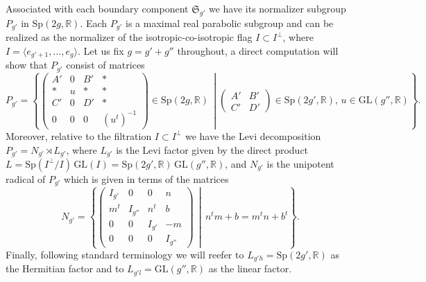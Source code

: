 \documentclass[11pt]{amsart}
\theoremstyle{plain}
\theoremstyle{definition}
\theoremstyle{remark}
\newcommand{\R}{\mathbb R}
\newcommand{\fS}{\mathfrak{S}}
\newcommand{\Sp}{\mathrm{Sp}}
\begin{document}
Associated with each boundary component $\fS_{g'}$ we have its normalizer subgroup $P_{g'}$ in $\Sp(2g,\R)$. Each $P_{g'}$ is a maximal real parabolic subgroup and can be realized as the normalizer of the isotropic-co-isotropic flag $I\subset I^{\perp}$, where $I=\langle e_{g'+1},\dots,e_g\rangle$. Let us fix $g=g'+g''$ throughout, a direct computation will show that $P_{g'}$ consist of matrices 
\[
P_{g'} =
    \left\{ 
        \begin{pmatrix}
        A'& 0 & B' & * \\
        * & u & * & *\\
        C' & 0 & D' & * \\
        0 & 0 & 0 & (u^t)^{-1}
        \end{pmatrix}\!\in \Sp(2g,\R)\, 
        \middle|
        \begin{pmatrix}
            A'&B'\\
            C'&D' 
        \end{pmatrix}\!\in \Sp(2g',\R),\, u \in \mathrm{GL}(g'',\R)
    \right\}.
\]
Moreover, relative to the filtration $I\subset I^{\perp}$ we have the Levi decomposition $P_{g'}=N_{g'}\rtimes L_{g'}$, where $L_{g'}$ is the Levi factor given by the direct product $L=\Sp(I^{\perp}/I)\,\mathrm{GL}(I)=\Sp(2g',\R)\,\mathrm{GL}(g'',\R)$, and $N_{g'}$ is the unipotent radical of $P_{g'}$ which is given in terms of the matrices
\[
N_{g'}=
    \left\{ 
        \begin{pmatrix}
        I_{g'} & 0      & 0     & n \\
        m^t    & I_{g''}& n^t   & b \\
        0      & 0      & I_{g'}& -m\\
        0      & 0      & 0     & I_{g''}
        \end{pmatrix}\, 
        \middle|\,
        n^t m + b = m^t n + b^t
    \right\}.
\]
Finally, following standard terminology we will reefer to $L_{g'h}=\Sp(2g',\R)$ as the Hermitian factor and to $L_{g'l}=\mathrm{GL}(g'',\R)$ as the linear factor. 
\end{document}
